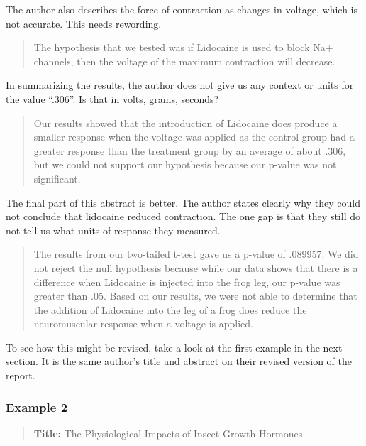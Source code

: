 \documentclass[
]{book}
\begin{document}
The author also describes the force of contraction as changes in voltage, which is not accurate. This needs rewording.

\begin{quote}
The hypothesis that we tested was if Lidocaine is used to block Na+ channels, then the voltage of the maximum contraction will decrease.
\end{quote}

In summarizing the results, the author does not give us any context or units for the value ``.306''. Is that in volts, grams, seconds?

\begin{quote}
Our results showed that the introduction of Lidocaine does produce a smaller response when the voltage was applied as the control group had a greater response than the treatment group by an average of about .306, but we could not support our hypothesis because our p-value was not significant.
\end{quote}

The final part of this abstract is better. The author states clearly why they could not conclude that lidocaine reduced contraction. The one gap is that they still do not tell us what units of response they measured.

\begin{quote}
The results from our two-tailed t-test gave us a p-value of .089957. We did not reject the null hypothesis because while our data shows that there is a difference when Lidocaine is injected into the frog leg, our p-value was greater than .05. Based on our results, we were not able to determine that the addition of Lidocaine into the leg of a frog does reduce the neuromuscular response when a voltage is applied.
\end{quote}

To see how this might be revised, take a look at the first example in the next section. It is the same author's title and abstract on their revised version of the report.

\hypertarget{example-2}{%
\subsubsection{Example 2}\label{example-2}}

\begin{quote}
\textbf{Title:} The Physiological Impacts of Insect Growth Hormones
\end{quote}
\end{document}
